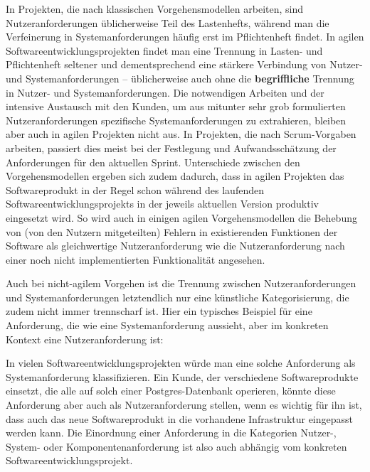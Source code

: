 In Projekten, die nach klassischen Vorgehensmodellen arbeiten, sind Nutzeranforderungen üblicherweise Teil des Lastenhefts, während man die Verfeinerung in Systemanforderungen häufig erst im Pflichtenheft findet. In agilen Software\-entwicklungs\-projekten findet man eine Trennung in Lasten- und Pflichtenheft seltener und dem\-entsprechend eine stärkere Verbindung von Nutzer- und Systemanforderungen -- 
\linebreak %
üblicherweise auch ohne die \textbf{begriffliche} Trennung in Nutzer- und Systemanforderungen. Die notwendigen Arbeiten und der intensive Austausch mit den Kunden, um aus mitunter sehr grob formulierten Nutzeranforderungen spezifische System\-anforderungen zu extrahieren, bleiben aber auch in agilen Projekten nicht aus. In Projekten, die nach Scrum-Vorgaben arbeiten, passiert dies meist bei der Festlegung und Aufwandsschätzung der Anforderungen für den aktuellen Sprint. Unterschiede zwischen den Vorgehensmodellen ergeben sich zudem dadurch, dass in agilen Projekten das Softwareprodukt in der Regel schon während des laufenden Software\-entwicklungs\-projekts in der jeweils aktuellen Version produktiv eingesetzt wird. So wird auch in einigen agilen Vorgehensmodellen die Behebung von (von den Nutzern mitgeteilten) Fehlern in existierenden Funktionen der Software als gleichwertige Nutzeranforderung wie die Nutzeranforderung nach einer noch nicht implementierten Funktionalität angesehen.

Auch bei nicht-agilem Vorgehen ist die Trennung zwischen Nutzeranforderungen und Systemanforderungen letztendlich nur eine künstliche Kategorisierung, die zudem nicht immer trennscharf ist. Hier ein typisches Beispiel für eine Anforderung, die wie eine Systemanforderung aussieht, aber im konkreten Kontext eine Nutzer\-anforderung ist:


In vielen Softwareentwicklungsprojekten würde man eine solche Anforderung als Systemanforderung klassifizieren. Ein Kunde, der verschiedene Softwareprodukte einsetzt, die alle auf solch einer Postgres-Datenbank operieren, könnte diese Anforderung aber auch als Nutzeranforderung stellen, wenn es wichtig für ihn ist, dass auch das neue Softwareprodukt in die vorhandene Infrastruktur eingepasst werden kann. Die Einordnung einer Anforderung in die Kategorien Nutzer-, System- oder Komponentenanforderung ist also auch abhängig vom konkreten Softwareentwicklungsprojekt.